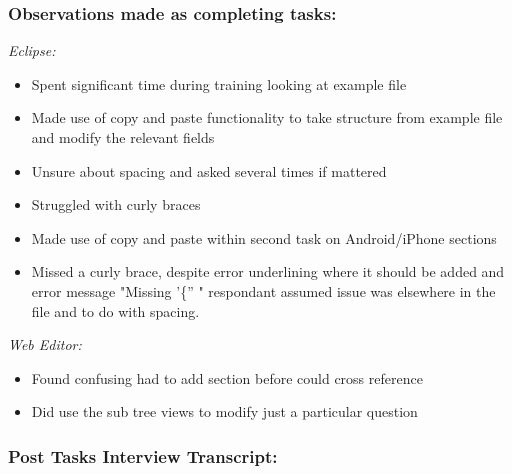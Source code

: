 \documentclass{report}
\begin{document}
\subsubsection*{Observations made as completing tasks:}

\emph{Eclipse:}
\begin{itemize}
\item Spent significant time during training looking at example file
\item Made use of copy and paste functionality to take structure from example file and modify the relevant fields
\item Unsure about spacing and asked several times if mattered
\item Struggled with curly braces
\item Made use of copy and paste within second task on Android/iPhone sections
\item Missed a curly brace, despite error underlining where it should be added and error message "Missing '\{'' " respondant assumed issue was elsewhere in the file and to do with spacing.
\end{itemize}
\emph{Web Editor:}
\begin{itemize}
\item Found confusing had to add section before could cross reference
\item Did use the sub tree views to modify just a particular question
\end{itemize}

\subsubsection*{Post Tasks Interview Transcript:}
\end{document}
